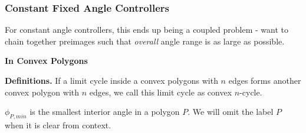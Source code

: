 \documentclass[]{styles/svproc}  %
\begin{document}
\subsubsection{Constant Fixed Angle Controllers}

For constant angle controllers, this
ends up being a coupled problem - want to chain together preimages such that
\emph{overall} angle range is as large as possible.

\textbf{In Convex Polygons}

\textbf{Definitions.}
If a limit cycle inside a convex polygons with $n$ edges forms another convex polygon with $n$ edges, we call this limit cycle as convex $n$-cycle.

\begin{definition}
$\phi_{P,min}$ is the smallest interior angle in a polygon $P$. We will omit the
label $P$ when it is clear from context.
\end{definition}
\end{document}
